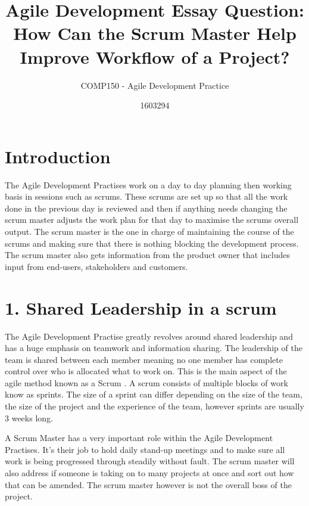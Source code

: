 \documentclass{scrartcl}
\title{Agile Development Essay Question: How Can the Scrum Master Help Improve Workflow of a Project?}
\subtitle{COMP150 - Agile Development Practice}
\author{1603294}
\begin{document}
\maketitle


\section{Introduction}

The Agile Development Practises work on a day to day planning then working basis in sessions such as scrums. These scrums are set up so that all the work done in the previous day is reviewed and then if anything needs changing the scrum master adjusts the work plan for that day to maximise the scrums overall output. The scrum master is the one in charge of maintaining the course of the scrums and making sure that there is nothing blocking the development process. The scrum master also gets information from the product owner that includes input from end-users, stakeholders and customers.

\section{1. Shared Leadership in a scrum}

The Agile Development Practise greatly revolves around shared leadership and has a huge emphasis on teamwork and information sharing. The leadership of the team is shared between each member \cite{moe2009understanding} meaning no one member has complete control over who is allocated what to work on. This is the main aspect of the agile method known as a Scrum \cite{moe2009understanding}. A scrum consists of multiple blocks of work know as sprints. The size of a sprint can differ depending on the size of the team, the size of the project and the experience of the team, however sprints are usually 3 weeks long.

A Scrum Master has a very important role within the Agile Development Practises. It's their job to hold daily stand-up meetings and to make sure all work is being progressed through steadily without fault. The scrum master will also address if someone is taking on to many projects at once and sort out how that can be amended. The scrum master however is not the overall boss of the project.
\end{document}

